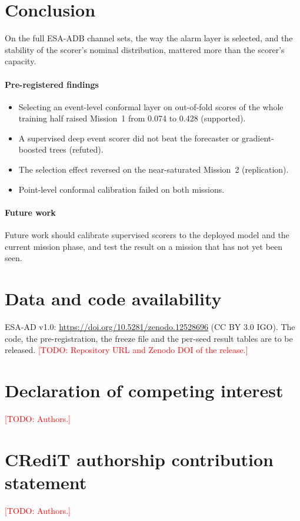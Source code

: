 \documentclass[preprint,12pt,authoryear]{elsarticle}
\newcommand{\todo}[1]{\textcolor{red}{[TODO: #1]}}
\begin{document}
\section{Conclusion}
On the full ESA-ADB channel sets, the way the alarm layer is selected, and the stability of
the scorer's nominal distribution, mattered more than the scorer's capacity.

\paragraph{Pre-registered findings}
\begin{itemize}
\item Selecting an event-level conformal layer on out-of-fold scores of the whole training
  half raised Mission~1 from 0.074 to 0.428 (supported).
\item A supervised deep event scorer did not beat the forecaster or gradient-boosted trees
  (refuted).
\item The selection effect reversed on the near-saturated Mission~2 (replication).
\item Point-level conformal calibration failed on both missions.
\end{itemize}

\paragraph{Future work}
Future work should calibrate supervised scorers to the deployed model and the current
mission phase, and test the result on a mission that has not yet been seen.

\section*{Data and code availability}
ESA-AD v1.0: \url{https://doi.org/10.5281/zenodo.12528696} (CC BY 3.0 IGO). The code, the
pre-registration, the freeze file and the per-seed result tables are to be released.
\todo{Repository URL and Zenodo DOI of the release.}

\section*{Declaration of competing interest}
\todo{Authors.}

\section*{CRediT authorship contribution statement}
\todo{Authors.}
\end{document}
